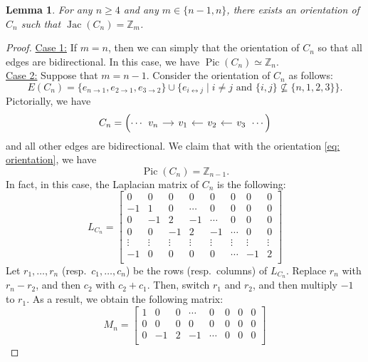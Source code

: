 \documentclass[11pt,reqno]{amsart}
\DeclareMathOperator{\Pic}{Pic}
\DeclareMathOperator{\Jac}{Jac}
\newcommand{\Z}{\mathbb{Z}}
\theoremstyle{definition}
\theoremstyle{plain}
\newtheorem{lem}[mydef]{Lemma}
\begin{document}
\begin{lem} \label{lemma: obj4}
For any $n \ge 4$ and any $m \in \{ n-1, n \}$, there exists an orientation of $C_n$ such that $\Jac (C_n) = \Z_m$. 
\end{lem}

\begin{proof}
\noindent \underline{Case 1:} If $m=n$, then we can simply that the orientation of $C_n$ so that all edges are bidirectional. In this case, we have $\Pic (C_n) \simeq \Z_n$. \\


\noindent \underline{Case 2:} Suppose that $m=n-1$. Consider the orientation of $C_n$ as follows:
\begin{equation}\label{eq: orientation}
E(C_n)=\{e_{n \to 1}, e_{2 \to 1}, e_{3 \to 2}\} \cup \{e_{i \leftrightarrow j} \mid i\neq j \textrm{ and } \{i,j\} \not \subseteq \{n,1,2,3\} \}.
\end{equation}
Pictorially, we have
\[
C_n= \left( \cdots \begin{tikzcd}[column sep=0.4cm]
v_n \arrow[r] & v_1 & v_2 \arrow[l] & v_3 \arrow[l]
\end{tikzcd} \cdots \right)
\]
and all other edges are bidirectional. We claim that with the orientation \eqref{eq: orientation}, we have
\[
\Pic(C_n)=\mathbb{Z}_{n-1}. 
\] 
In fact, in this case, the Laplacian matrix of $C_n$ is the following:
\[
L_{C_n} = \begin{bmatrix}
	0 & 0 & 0 & 0 & 0 & 0 & 0 & 0   \\
	-1 & 1 & 0 & \cdots & 0 & 0 & 0 & 0  \\
	0 & -1 & 2 & -1 & \cdots & 0 & 0 & 0 \\
	0 & 0 & -1 & 2 & -1 & \cdots & 0 & 0  \\
\vdots & \vdots & \vdots & \vdots & \vdots & \vdots & \vdots& \vdots  \\
	-1 & 0 & 0 & 0 & 0 & \cdots & -1 & 2 \\
\end{bmatrix}
\]
Let $r_1,\dots,r_{n}$ (resp.~$c_1,\dots,c_{n}$) be the rows (resp.~columns) of $L_{C_n}$. Replace $r_n$ with $r_n-r_2$, and then $c_2$ with $c_2+c_1$. Then, switch $r_1$ and $r_2$, and then multiply $-1$ to $r_1$. As a result, we obtain the following matrix:
\[
M_n=\begin{bmatrix}
	1 & 0 & 0 & \cdots & 0 & 0 & 0 & 0 \\
	0 & 0 & 0 & 0 & 0 & 0 & 0 & 0   \\
	0 & -1 & 2 & -1 & \cdots & 0 & 0 & 0 \\

\end{bmatrix}\]
\end{proof}
\end{document}
